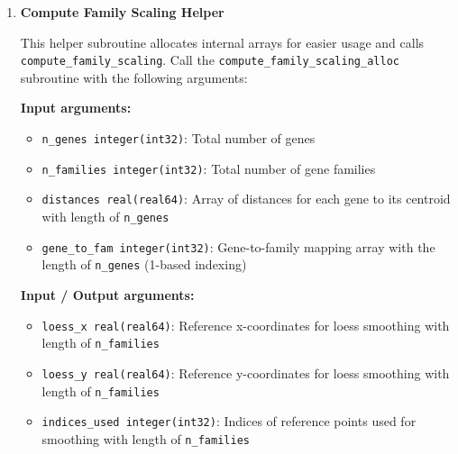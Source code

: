 \documentclass[11pt]{article}
\begin{document}
\begin{enumerate}
\begin{enumerate}
\begin{enumerate}
	      	      	\item \textbf{Compute Family Scaling Helper}
	      	      	      
	      	      	      This helper subroutine allocates internal arrays for easier usage and
	      	      	      calls \texttt{compute\_family\_scaling}. Call the \texttt{compute\_family\_scaling\_alloc}
	      	      	      subroutine with the following arguments:
	      	      	      
	      	      	      \textbf{Input arguments:}
	      	      	      \begin{itemize}
	      	      	      	\item \texttt{n\_genes integer(int32)}: Total number of genes
	      	      	      	      
	      	      	      	\item \texttt{n\_families integer(int32)}: Total number of gene families
	      	      	      	      
	      	      	      	\item \texttt{distances real(real64)}: Array of distances for each
	      	      	      	      gene to its centroid with length of \texttt{n\_genes}
	      	      	      	      
	      	      	      	\item \texttt{gene\_to\_fam integer(int32)}: Gene-to-family mapping
	      	      	      	      array with the length of \texttt{n\_genes} (1-based indexing)
	      	      	      \end{itemize}
	      	      	      
	      	      	      \textbf{Input / Output arguments:}
	      	      	      \begin{itemize}
	      	      	      	\item \texttt{loess\_x real(real64)}: Reference x-coordinates for
	      	      	      	      loess smoothing with length of \texttt{n\_families}
	      	      	      	      
	      	      	      	\item \texttt{loess\_y real(real64)}: Reference y-coordinates for
	      	      	      	      loess smoothing with length of \texttt{n\_families}
	      	      	      	      
	      	      	      	\item \texttt{indices\_used integer(int32)}: Indices of reference
	      	      	      	      points used for smoothing with length of \texttt{n\_families}
	      	      	      \end{itemize}
	      	      	      

\end{enumerate}
\end{enumerate}
\end{enumerate}
\end{document}

